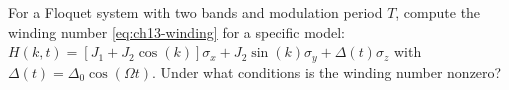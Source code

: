 \begin{exercise}
  For a Floquet system with two bands and modulation period $T$,
  compute the winding number \eqref{eq:ch13-winding} for a specific
  model: $H(k,t) = [J_1+J_2\cos(k)]\sigma_x + J_2\sin(k)\sigma_y
  + \Delta(t)\sigma_z$ with $\Delta(t)=\Delta_0\cos(\Omega t)$.  Under
  what conditions is the winding number nonzero?
\end{exercise}
